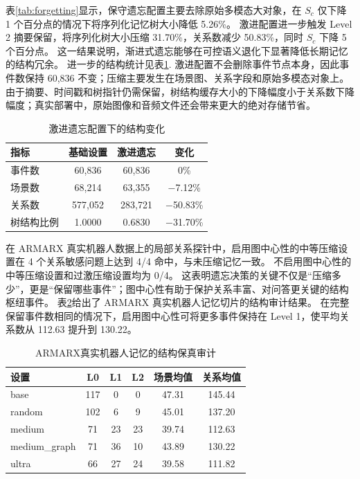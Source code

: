 \documentclass{cjc}
\begin{document}
表\ref{tab:forgetting}显示，保守遗忘配置主要去除原始多模态大对象，在 $S_c$ 仅下降 1 个百分点的情况下将序列化记忆树大小降低 5.26\%。
激进配置进一步触发 Level 2 摘要保留，将序列化树大小压缩 31.70\%，关系数减少 50.83\%，同时 $S_c$ 下降 5 个百分点。
这一结果说明，渐进式遗忘能够在可控语义退化下显著降低长期记忆的结构冗余。
进一步的结构统计见表\ref{tab:aggressive}.
激进配置不会删除事件节点本身，因此事件数保持 60,836 不变；压缩主要发生在场景图、关系字段和原始多模态对象上。
由于摘要、时间戳和树指针仍需保留，树结构缓存大小的下降幅度小于关系数下降幅度；真实部署中，原始图像和音频文件还会带来更大的绝对存储节省。

\begin{table}[t]
  \centering
  \caption{激进遗忘配置下的结构变化}
  \label{tab:aggressive}
  \small
  \begin{tabular}{lccc}
    \toprule
    指标 & 基础设置 & 激进遗忘 & 变化 \\
    \midrule
    事件数 & 60,836 & 60,836 & 0\% \\
    场景数 & 68,214 & 63,355 & $-$7.12\% \\
    关系数 & 577,052 & 283,721 & $-$50.83\% \\
    树结构比例 & 1.0000 & 0.6830 & $-$31.70\% \\
    \bottomrule
  \end{tabular}
\end{table}

在 ARMARX 真实机器人数据上的局部关系探针中，启用图中心性的中等压缩设置在 4 个关系敏感问题上达到 4/4 命中，与未压缩记忆一致。
不启用图中心性的中等压缩设置和过激压缩设置均为 0/4。
这表明遗忘决策的关键不仅是“压缩多少”，更是“保留哪些事件”；图中心性有助于保护关系丰富、对问答更关键的结构枢纽事件。
表\ref{tab:armarx}给出了 ARMARX 真实机器人记忆切片的结构审计结果。
在完整保留事件数相同的情况下，启用图中心性可将更多事件保持在 Level 1，使平均关系数从 112.63 提升到 130.22。

\begin{table}[t]
  \centering
  \caption{ARMARX真实机器人记忆的结构保真审计}
  \label{tab:armarx}
  \small
  \begin{tabular}{lccccc}
    \toprule
    设置 & L0 & L1 & L2 & 场景均值 & 关系均值 \\
    \midrule
    base & 117 & 0  & 0  & 47.31 & 145.44 \\
    random & 102 & 6  & 9  & 45.01 & 137.20 \\
    medium & 71  & 23 & 23 & 39.74 & 112.63 \\
    medium\_graph & 71 & 36 & 10 & 43.89 & 130.22 \\
    ultra & 66 & 27 & 24 & 39.58 & 111.82 \\
    \bottomrule
  \end{tabular}
\end{table}
\end{document}
